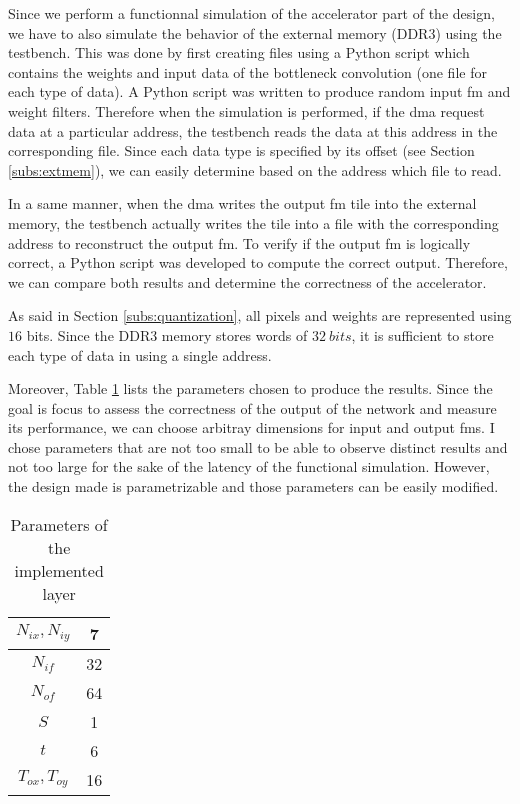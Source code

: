 Since we perform a functionnal simulation of the accelerator part of the design, we have to also simulate the behavior of the external memory (DDR3) using the testbench. This was done by first creating files using a Python script which contains the weights and input data of the bottleneck convolution (one file for each type of data). A Python script was written to produce random input \acrshort{fm} and weight filters. Therefore when the simulation is performed, if the \acrshort{dma} request data at a particular address, the testbench reads the data at this address in the corresponding file. Since each data type is specified by its offset (see Section \ref{subs:extmem}), we can easily determine based on the address which file to read.

In a same manner, when the \acrshort{dma} writes the output \acrshort{fm} tile into the external memory, the testbench actually writes the tile into a file with the corresponding address to reconstruct the output \acrshort{fm}. To verify if the output \acrshort{fm} is logically correct, a Python script was developed to compute the correct output. Therefore, we can compare both results and determine the correctness of the accelerator.

As said in Section \ref{subs:quantization}, all pixels and weights are represented using $16$ bits. Since the DDR3 memory stores words of $32 \ bits$, it is sufficient to store each type of data in using a single address.

Moreover, Table \ref{tab:param} lists the parameters chosen to produce the results. Since the goal is focus to assess the correctness of the output of the network and measure its performance, we can choose arbitray dimensions for input and output \acrshort{fm}s. I chose parameters that are not too small to be able to observe distinct results and not too large for the sake of the latency of the functional simulation. However, the design made is parametrizable and those parameters can be easily modified.
%
\begin{table}[H]
    \centering
    \begin{tabular}{|c|c|}
    \hline
    $N_{ix}, N_{iy}$ & 7 \\
    \hline
    $N_{if} $ & 32 \\
    \hline
    $N_{of}$ & 64 \\
    \hline
    $S$ & 1\\
    \hline
    $t$ & 6 \\
    \hline
    $T_{ox}, T_{oy}$ & 16 \\
    \hline
    \end{tabular}
    \caption{Parameters of the implemented layer}
    \label{tab:param}
\end{table}
%
